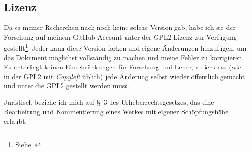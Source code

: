 \subsection*{Lizenz}

Da es meiner Recherchen nach noch keine solche Version gab, habe ich sie der
Forschung auf meinem GitHub-Account unter der GPL2-Lizenz zur Verfügung
gestellt\footnote{Siehe .}.
Jeder kann diese Version forken und eigene Änderungen hinzufügen, um das
Dokument möglichst vollständig zu machen und meine Fehler zu korrigieren.
Es unterliegt keinen Einschränkungen für Forschung und Lehre, außer dass
(wie in der GPL2 mit \textit{Copyleft} üblich) jede Änderung selbst wieder
öffentlich gemacht und unter die GPL2 gestellt werden muss.

Juristisch beziehe ich mich auf §~3 des Urheberrechtsgesetzes, das eine
Bearbeitung und Kommentierung eines Werkes mit eigener Schöpfungshöhe
erlaubt.

\newpage

\printbibliography

\newpage
{}
\setcounter{footnote}{0}
\setcounter{page}{173}
\let\thefootnote\originalthefootnote
